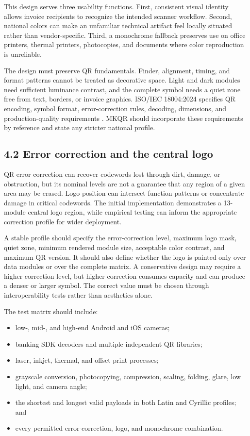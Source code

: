 This design serves three usability functions. First, consistent visual identity allows invoice recipients to recognize the intended scanner workflow. Second, national colors can make an unfamiliar technical artifact feel locally situated rather than vendor-specific. Third, a monochrome fallback preserves use on office printers, thermal printers, photocopies, and documents where color reproduction is unreliable.

The design must preserve QR fundamentals. Finder, alignment, timing, and format patterns cannot be treated as decorative space. Light and dark modules need sufficient luminance contrast, and the complete symbol needs a quiet zone free from text, borders, or invoice graphics. ISO/IEC 18004:2024 specifies QR encoding, symbol format, error-correction rules, decoding, dimensions, and production-quality requirements \cite{iso18004}. MKQR should incorporate these requirements by reference and state any stricter national profile.

\subsection{4.2 Error correction and the central logo}

QR error correction can recover codewords lost through dirt, damage, or obstruction, but its nominal levels are not a guarantee that any region of a given area may be erased. Logo position can intersect function patterns or concentrate damage in critical codewords. The initial implementation demonstrates a 13-module central logo region, while empirical testing can inform the appropriate correction profile for wider deployment.

A stable profile should specify the error-correction level, maximum logo mask, quiet zone, minimum rendered module size, acceptable color contrast, and maximum QR version. It should also define whether the logo is painted only over data modules or over the complete matrix. A conservative design may require a higher correction level, but higher correction consumes capacity and can produce a denser or larger symbol. The correct value must be chosen through interoperability tests rather than aesthetics alone.

The test matrix should include:

\begin{itemize}
\item low-, mid-, and high-end Android and iOS cameras;
\item banking SDK decoders and multiple independent QR libraries;
\item laser, inkjet, thermal, and offset print processes;
\item grayscale conversion, photocopying, compression, scaling, folding, glare, low light, and camera angle;
\item the shortest and longest valid payloads in both Latin and Cyrillic profiles; and
\item every permitted error-correction, logo, and monochrome combination.
\end{itemize}

